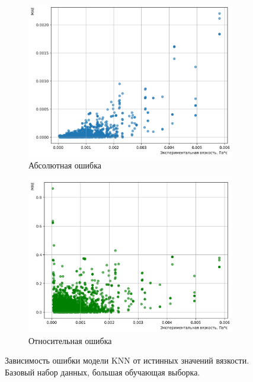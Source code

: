 \documentclass[a4paper,12pt]{article}
\begin{document}
      \begin{figure}[ht!]
        \centering
        \begin{subfigure}{0.48\textwidth}
            \centering
            \includegraphics[width=\linewidth]{knn/MAE_KNN (k=3)_0.2_base.png}
            \caption{Абсолютная ошибка}
        \end{subfigure}
        \hfill
        \begin{subfigure}{0.48\textwidth}
            \centering
            \includegraphics[width=\linewidth]{knn/MRE_KNN (k=3)_0.2_base.png}
            \caption{Относительная ошибка}
        \end{subfigure}
        \caption{Зависимость ошибки модели KNN от истинных значений вязкости. Базовый набор данных, большая обучающая выборка.}
        \label{fig:knn_errors_02_base}
      \end{figure}
      
\end{document}
